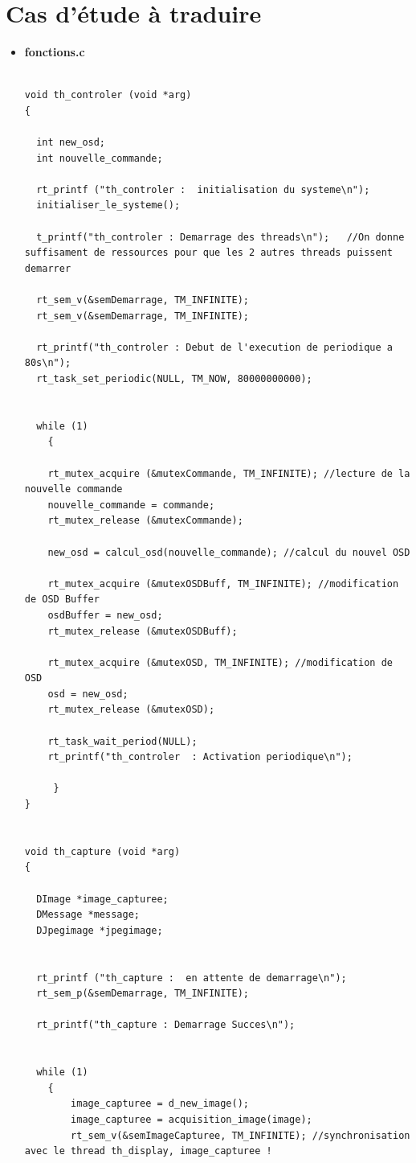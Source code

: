 \documentclass[11pt, a4paper]{paper}
\begin{document}
\section{Cas d'étude à traduire}
\label{ann:conception}
\begin{itemize}
\item \large{\bf fonctions.c}

\lstset{language=C} 
\begin{lstlisting}

void th_controler (void *arg)
{

  int new_osd;
  int nouvelle_commande;

  rt_printf ("th_controler :  initialisation du systeme\n");
  initialiser_le_systeme();

  t_printf("th_controler : Demarrage des threads\n");   //On donne suffisament de ressources pour que les 2 autres threads puissent demarrer

  rt_sem_v(&semDemarrage, TM_INFINITE);
  rt_sem_v(&semDemarrage, TM_INFINITE);

  rt_printf("th_controler : Debut de l'execution de periodique a 80s\n");
  rt_task_set_periodic(NULL, TM_NOW, 80000000000);


  while (1)
    {

    rt_mutex_acquire (&mutexCommande, TM_INFINITE); //lecture de la nouvelle commande
    nouvelle_commande = commande;
    rt_mutex_release (&mutexCommande);

    new_osd = calcul_osd(nouvelle_commande); //calcul du nouvel OSD

    rt_mutex_acquire (&mutexOSDBuff, TM_INFINITE); //modification de OSD Buffer
    osdBuffer = new_osd;
    rt_mutex_release (&mutexOSDBuff);

    rt_mutex_acquire (&mutexOSD, TM_INFINITE); //modification de OSD
    osd = new_osd;
    rt_mutex_release (&mutexOSD);

    rt_task_wait_period(NULL);
    rt_printf("th_controler  : Activation periodique\n");

	 }
}


void th_capture (void *arg)
{

  DImage *image_capturee;
  DMessage *message;
  DJpegimage *jpegimage;


  rt_printf ("th_capture :  en attente de demarrage\n");
  rt_sem_p(&semDemarrage, TM_INFINITE);

  rt_printf("th_capture : Demarrage Succes\n");


  while (1)
    {
        image_capturee = d_new_image();
        image_capturee = acquisition_image(image);
        rt_sem_v(&semImageCapturee, TM_INFINITE); //synchronisation avec le thread th_display, image_capturee !



\end{lstlisting}
\end{itemize}
\end{document}
